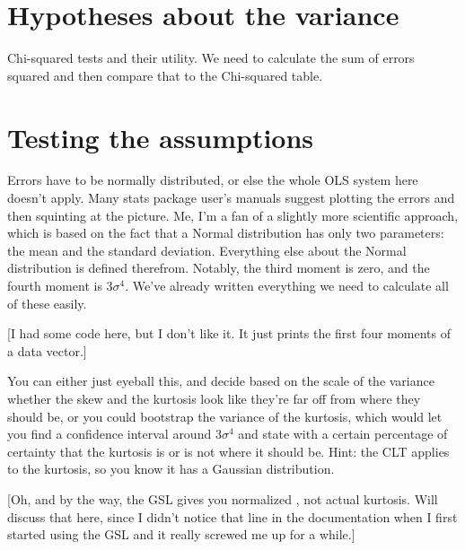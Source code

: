 \section{Hypotheses about the variance}
Chi-squared tests and their utility. We need to calculate the sum of errors squared 
and then compare that to the Chi-squared table. 


\section{Testing the assumptions} Errors have to be normally distributed, or else
the whole OLS system here doesn't apply. Many stats package user's manuals
suggest plotting the errors and then squinting at the picture. Me, I'm a
fan of a slightly more scientific approach, which is based on the fact
that a Normal distribution has only two parameters: the mean and the
standard deviation. Everything else about the Normal distribution is
defined therefrom. Notably, the third moment is zero, and the fourth
moment is $3 \sigma^4$. We've already written everything we need to calculate all of these easily.


[I had some code here, but I don't like it. It just prints the first four moments of a data vector.]

You can either just eyeball this, and decide based on the scale of the variance
whether the skew and the kurtosis look like they're far off from where they should
be, or you could bootstrap the variance of the kurtosis, which would let you find
a confidence interval around $3 \sigma^4$ and state with a certain percentage
of certainty that the kurtosis is or is not where it should be. Hint: the CLT applies to the kurtosis,
so you know it has a Gaussian distribution.

[Oh, and by the way, the GSL gives you normalized ,
not actual kurtosis.  Will discuss that here, since I didn't notice that
line in the documentation 
when I first started using the GSL and it really screwed me up for a
while.]

